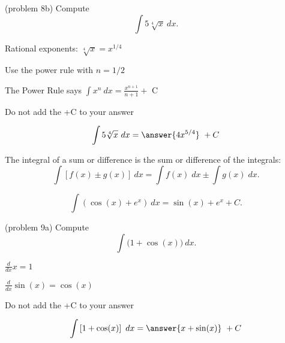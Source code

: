 \documentclass[handout]{ximera}
\begin{document}
\begin{problem}(problem 8b)
Compute 
\[
\int 5\sqrt[4]x \ dx.
\]

\begin{hint}
Rational exponents: $\sqrt[4]x = x^{1/4}$
\end{hint}
\begin{hint}
Use the power rule with $n=1/2$
\end{hint}
\begin{hint}
The Power Rule says $\int x^n \ dx = \frac{x^{n+1}}{n+1} +$ C
\end{hint}
\begin{hint}
\begin{center}
Do not add the +C to your answer
\end{center}
\end{hint}

\[
\int 5\sqrt[4]x \ dx =
\answer{4x^{5/4}} \ + C
\]
\end{problem}



\begin{theorem}
The integral of a sum or difference is the sum or difference of the integrals:
\[
\int \left[f(x)\pm g(x)\right] \ dx = \int f(x) \; dx  \pm  \int g(x) \; dx.
\]
\end{theorem}



\begin{example}[example 9]
\[
\int \left(\cos(x) + e^x\right) \ dx = \sin(x) + e^x + C.
\]
\end{example}

\begin{problem}(problem 9a)
Compute
\[
\int \big(1 + \cos(x) \big) \ dx.
\]

\begin{hint}
$\frac{d}{dx} x = 1$
\end{hint}
\begin{hint}
$\frac{d}{dx} \sin(x) = \cos(x)$
\end{hint}
\begin{hint}
\begin{center}
Do not add the +C to your answer
\end{center}
\end{hint}

\[
\int \left[1 + \cos(x) \right] \ dx =
\answer{x + \sin(x)} \ +  C
\]
\end{problem}
\end{document}
